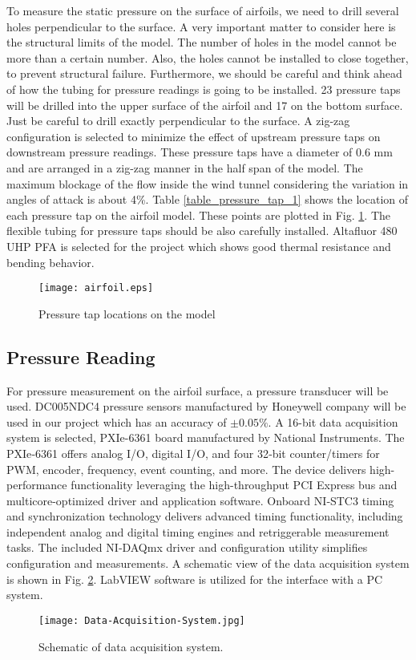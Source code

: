 \documentclass[fleqn,10pt]{SelfArx} %
\begin{document}
To measure the static pressure on the surface of airfoils, we need to drill several holes perpendicular to the surface. A very important matter to consider here is the structural limits of the model. The number of holes in the model cannot be more than a certain number. Also, the holes cannot be installed to close together, to prevent structural failure. Furthermore, we should be careful and think ahead of how the tubing for pressure readings is going to be installed. 23 pressure taps will be drilled into the upper surface of the airfoil and 17 on the bottom surface. Just be careful to drill exactly perpendicular to the surface. A zig-zag configuration is selected to minimize the effect of upstream pressure taps on downstream pressure readings. These pressure taps have a diameter of 0.6 mm and are arranged in a zig-zag manner in the half span of the model. The maximum blockage of the flow inside the wind tunnel considering the variation in angles of attack is about 4\%. Table \ref{table_pressure_tap_1} shows the location of each pressure tap on the airfoil model. These points are plotted in Fig. \ref{fig_pressure_tap_1}. The flexible tubing for pressure taps should be also carefully installed. Altafluor 480 UHP PFA is selected for the project which shows good thermal resistance and bending behavior.
\begin{figure}[ht]\centering
\texttt{[image: airfoil.eps]}
\caption{Pressure tap locations on the model}
\label{fig_pressure_tap_1}
\end{figure}

\subsection{Pressure Reading}
For pressure measurement on the airfoil surface, a pressure transducer will be used. DC005NDC4 pressure sensors manufactured by Honeywell company will be used in our project which has an accuracy of $\pm 0.05\%$. A 16-bit data acquisition system is selected, PXIe-6361 board manufactured by National Instruments. The PXIe‑6361 offers analog I/O, digital I/O, and four 32‑bit counter/timers for PWM, encoder, frequency, event counting, and more. The device delivers high-performance functionality leveraging the high-throughput PCI Express bus and multicore-optimized driver and application software. Onboard NI‑STC3 timing and synchronization technology delivers advanced timing functionality, including independent analog and digital timing engines and retriggerable measurement tasks. The included NI‑DAQmx driver and configuration utility simplifies configuration and measurements. A schematic view of the data acquisition system is shown in Fig. \ref{fig_daq_1}. LabVIEW software is utilized for the interface with a PC system.
\begin{figure}[ht]\centering
\texttt{[image: Data-Acquisition-System.jpg]}
\caption{Schematic of data acquisition system.}
\label{fig_daq_1}
\end{figure}
\end{document}
